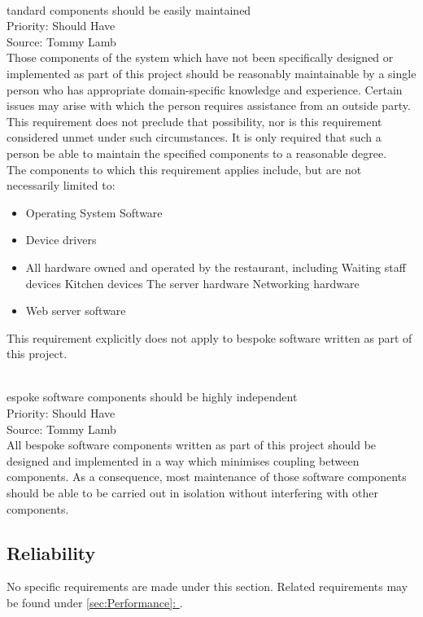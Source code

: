 \documentclass[11pt, a4paper]{report}
\newcommand{\gref}[1]{\hyperref[#1]{\autoref*{#1}: \nameref{#1}}} %
\def\itempar#1\\{\item \textbf{#1}\\} %
\begin{document}
\begin{enumerate}[resume*=nonfunctional]

\itempar Standard components should be easily maintained\\
Priority: Should Have\\
Source: Tommy Lamb\\
Those components of the system which have not been specifically designed or implemented as part of this project should be reasonably maintainable by a single person who has appropriate domain-specific knowledge and experience. Certain issues may arise with which the person requires assistance from an outside party. This requirement does not preclude that possibility, nor is this requirement considered unmet under such circumstances. It is only required that such a person be able to maintain the specified components to a reasonable degree.\\
The components to which this requirement applies include, but are not necessarily limited to:
\begin{itemize}
\item Operating System Software
\item Device drivers
\item All hardware owned and operated by the restaurant, including
	\subitem Waiting staff devices
	\subitem Kitchen devices
	\subitem The server hardware
	\subitem Networking hardware
\item Web server software
\end{itemize}
This requirement explicitly does not apply to bespoke software written as part of this project.

\itempar Bespoke software components should be highly independent\\
Priority: Should Have\\
Source: Tommy Lamb\\
All bespoke software components written as part of this project should be designed and implemented in a way which minimises coupling between components. As a consequence, most maintenance of those software components should be able to be carried out in isolation without interfering with other components.
\end{enumerate}

\subsection{Reliability} \label{subsec:Reliability}

No specific requirements are made under this section. Related requirements may be found under \gref{sec:Performance}.
\end{document}
